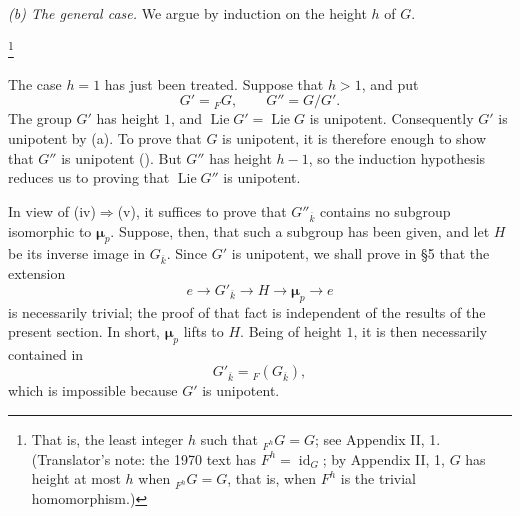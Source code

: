 
\medskip\noindent\textit{(b) The general case.}\quad
We argue by induction on the height \(h\) of
\(G\).{\renewcommand{\thefootnote}{*}\footnote{That is, the least
integer \(h\) such that \({}_{F^h}G=G\); see
Appendix II, 1. (Translator's note: the 1970 text has
\(F^h=\operatorname{id}_G\); by Appendix II, 1, \(G\) has height at
most \(h\) when \({}_{F^h}G=G\), that is, when \(F^h\) is the trivial
homomorphism.)}\addtocounter{footnote}{-1}}
The case \(h=1\) has just been treated.  Suppose that \(h>1\), and
put
\[
  G'={}_{F}G,
  \qquad
  G''=G/G'.
\]
The group \(G'\) has height \(1\), and
\(\operatorname{Lie}G'=\operatorname{Lie}G\) is unipotent.
Consequently \(G'\) is unipotent by (a).  To prove that \(G\) is
unipotent, it is therefore enough to show that \(G''\) is unipotent
().  But \(G''\) has height \(h-1\), so the induction
hypothesis reduces us to proving that \(\operatorname{Lie}G''\) is
unipotent.

In view of (iv)\(\Rightarrow\)(v), it suffices to prove that
\(G''_{\overline{k}}\) contains no subgroup isomorphic to
\(\boldsymbol\mu_p\).  Suppose, then, that such a subgroup has been
given, and let \(H\) be its inverse image in
\(G_{\overline{k}}\).  Since \(G'\) is unipotent, we shall prove
in \S5 that the extension
\[
  e\longrightarrow G'_{\overline{k}}
   \longrightarrow H
   \longrightarrow\boldsymbol\mu_p
   \longrightarrow e
\]
is necessarily trivial; the proof of that fact is independent of
the results of the present section.  In short,
\(\boldsymbol\mu_p\) lifts to \(H\).  Being of height \(1\), it is
then necessarily contained in
\[
  G'_{\overline{k}}={}_{F}(G_{\overline{k}}),
\]
which is impossible because \(G'\) is unipotent.
